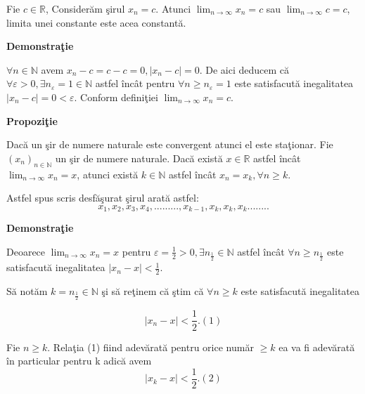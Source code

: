 \documentclass[a4paper,12pt,oneside]{report}
\begin{document}
Fie \(c \in \mathbb{R}\), Consider\u am \c sirul \(x_{n}=c\). Atunci \(\lim_{n \to \infty }x_{n}=c\) sau \(\lim_{n \to \infty }c=c\), limita unei constante este acea constant\u a. 

\textbf{Demonstra\c tie}

\(\forall n\in \mathbb{N}\) avem \(x_{n} - c = c - c = 0 , \left | x_{n}-c \right |= 0\). De aici deducem c\u a \(\forall \varepsilon > 0, \exists n_{\varepsilon} = 1 \in \mathbb{N}\) astfel \^ inc\^ at pentru \(\forall n\geq n_{\varepsilon }= 1\) este satisfacut\u a inegalitatea \(\left | x_{n}-c \right |= 0< \varepsilon\). 
	Conform defini\c tiei \(\lim_{n \to \infty }x_{n} = c. \)
	
\textbf{Propozi\c tie}

Dac\u a un \c sir de numere naturale este convergent atunci el este sta\c tionar. 
Fie \((x_{n})_{n\in \mathbb{N}}\) un \c sir de numere naturale. Dac\u a exist\u a \(x\in \mathbb{R}\) astfel \^ inc\^ at \(\lim_{n \to \infty }x_{n}= x\), atunci exist\u a \(k\in \mathbb{N}\) astfel \^ inc\^ at \(x_{n}= x_{k}, \forall n\geq k\).
	
Astfel spus scris desf\u a\c surat \c sirul arat\u a astfel:
\begin{displaymath}
x_{1},x_{2},x_{3},x_{4},.........,x_{k-1},x_{k},x_{k},x_{k}........
\end{displaymath}




\textbf{Demonstra\c tie}

Deoarece \(\lim_{n \to \infty }x_{n}= x\) pentru \(\varepsilon = \frac{1}{2}> 0, \exists n_{\frac{1}{2}}\in \mathbb{N}\) astfel \^ inc\^ at \(\forall n\geq n_{\frac{1}{2}}\) este satisfacut\u a inegalitatea \(\left | x_{n} -x \right |<  \frac{1}{2}\). 
	
S\u a not\u am \(k=n_{\frac{1}{2}}\in \mathbb{N}\) \c si s\u a re\c tinem c\u a \c stim c\u a \(\forall n\geq k \) este satisfacut\u a inegalitatea 

\begin{displaymath}
  \left | x_{n} -x \right |< \frac{1}{2}. (1) 
\end{displaymath}


Fie \(n\geq k\). Rela\c tia (1) fiind adev\u arat\u a pentru orice num\u ar \(\geq k\) ea va fi adev\u arat\u a \^ in particular pentru k adic\u a avem 
\begin{displaymath}
  \left | x_{k}-x \right |< \frac{1}{2}. (2)
\end{displaymath}
\end{document}
